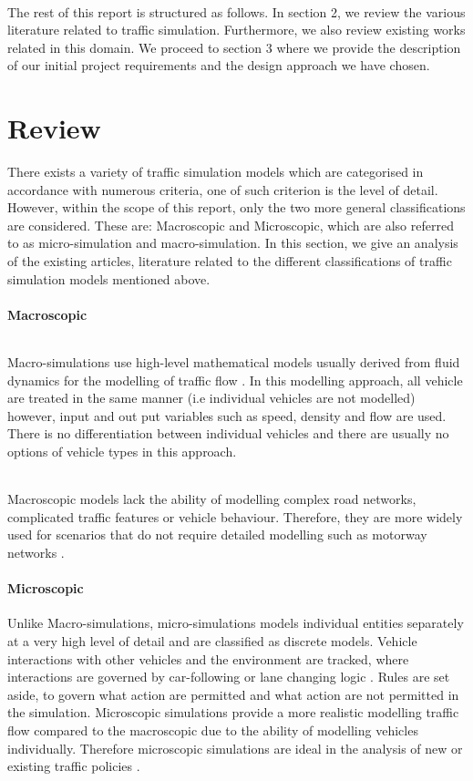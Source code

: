 \documentclass[a4paper,11pt,titlepage]{article}
\begin{document}
\paragraph{}
The rest of this report is structured as follows. In section 2, we review the various literature related to traffic simulation. Furthermore, we also review existing works related in this domain. We proceed to section 3 where we provide the description of our initial project requirements  and the design approach we have chosen.

\part{Review}
There exists a variety of traffic simulation models which are categorised in accordance with numerous criteria, one of such criterion is the level of detail. However, within the scope of this report, only the two more  general classifications are considered. These are: Macroscopic and Microscopic, which are also referred to as micro-simulation and macro-simulation. In this section, we give an analysis of the existing articles, literature related to the different classifications of traffic simulation models mentioned above.
\subsection{Macroscopic}
\paragraph{}
Macro-simulations use high-level mathematical models usually derived from fluid dynamics for the modelling of traffic flow \cite{Ali, Serge}.
In this modelling approach, all vehicle are treated in the same manner (i.e individual vehicles are not modelled) however, input and out put variables such as speed, density and flow are used. There is no differentiation between individual vehicles and there are usually no options of vehicle types in this approach.
\paragraph{}
Macroscopic models lack the ability of modelling complex road networks, complicated traffic features or vehicle behaviour. Therefore, they are more widely used for scenarios that do not require detailed modelling such as motorway networks \cite{Schulze}.
\subsection{Microscopic}
Unlike Macro-simulations, micro-simulations models individual entities separately at a very high level of detail and are classified as discrete models. Vehicle interactions with other vehicles and the environment are tracked, where interactions are governed by car-following or lane changing logic \cite{Ali}. Rules are set aside, to govern what action are permitted and what action are not permitted in the simulation. Microscopic simulations provide a more realistic modelling  traffic flow compared to the macroscopic due to the ability of modelling vehicles individually. Therefore microscopic simulations are ideal in the analysis of new or existing traffic policies \cite{Ali, Femke}.
\end{document}
